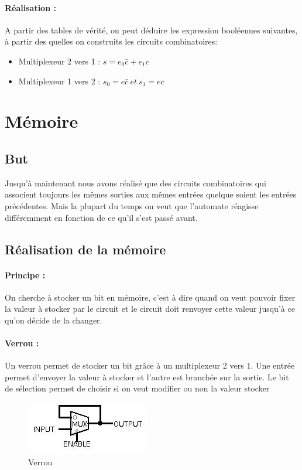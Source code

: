 \documentclass[10pt,a4paper,twoside]{article}
\begin{document}
\paragraph{Réalisation :} A partir des tables de vérité, on peut déduire les expression booléennes suivantes, à partir des quelles on construits les circuits combinatoires:
\begin{itemize}
\item Multiplexeur 2 vers 1 : $s = e_{0}\bar{c} + e_{1}c$
\item Multiplexeur 1 vers 2 : $s_{0} = e\bar{c} \ et\ s_{1} = ec$
\end{itemize}

\FloatBarrier
\newpage
\section{Mémoire}
\subsection{But}
Jusqu'à maintenant nous avons réalisé que des circuits combinatoires qui associent toujours les mêmes sorties aux mêmes entrées quelque soient les entrées précédentes. Mais la plupart du temps on veut que l'automate réagisse différemment en fonction de ce qu'il s'est passé avant.

\subsection{Réalisation de la mémoire}
\paragraph{Principe :} On cherche à stocker un bit en mémoire, c'est à dire quand on veut pouvoir fixer la valeur à stocker par le circuit et le circuit doit renvoyer cette valeur jusqu'à ce qu'on décide de la changer.\\
\paragraph{Verrou :} Un verrou permet de stocker un bit grâce à un multiplexeur 2 vers 1. Une entrée permet d'envoyer la valeur à stocker et l'autre est branchée sur la sortie. Le bit de sélection permet de choisir si on veut modifier ou non la valeur stocker\\

\begin{figure}[hbtp]
\caption{Verrou}
\centering
\includegraphics[scale=1]{Verrou.jpg}
\end{figure}
\FloatBarrier
\end{document}
